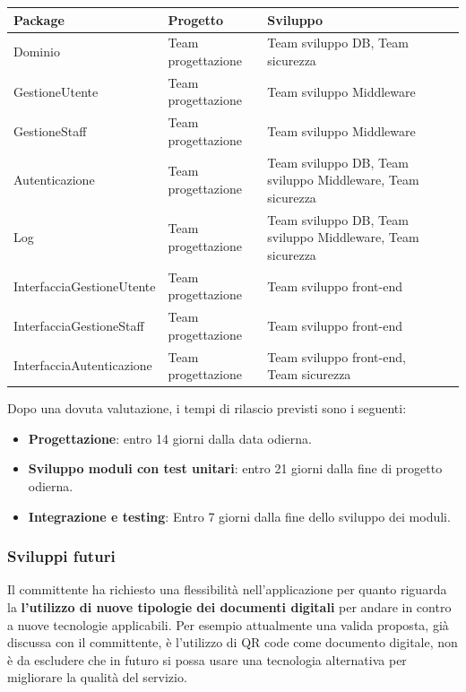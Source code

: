 \documentclass[a4paper]{article}
\begin{document}
\begin{center}
    \begin{tabularx}{1\textwidth}{|X|X|X|X|}
    \hline
    \textbf{Package} & \textbf{Progetto} & \textbf{Sviluppo}\\
    \hline
    \hline
    Dominio & Team progettazione & Team sviluppo DB, Team sicurezza  \\
    \hline
    GestioneUtente & Team progettazione & Team sviluppo Middleware\\
    \hline
    GestioneStaff & Team progettazione & Team sviluppo Middleware\\
    \hline
    Autenticazione & Team progettazione & Team sviluppo DB, Team sviluppo Middleware, Team sicurezza\\
    \hline
    Log & Team progettazione & Team sviluppo DB, Team sviluppo Middleware, Team sicurezza\\
    \hline
    InterfacciaGestioneUtente & Team progettazione & Team sviluppo front-end \\
    \hline
    InterfacciaGestioneStaff & Team progettazione & Team sviluppo front-end\\
    \hline
    InterfacciaAutenticazione & Team progettazione & Team sviluppo front-end, Team sicurezza\\
    \hline
    \end{tabularx}
\end{center}

Dopo una dovuta valutazione, i tempi di rilascio previsti sono i seguenti:

\begin{itemize}
    \item \textbf{Progettazione}: entro 14 giorni dalla data odierna.
    \item \textbf{Sviluppo moduli con test unitari}: entro 21 giorni dalla fine di progetto odierna.
    \item \textbf{Integrazione e testing}: Entro 7 giorni dalla fine dello sviluppo dei moduli.
\end{itemize}

\subsubsection{Sviluppi futuri}

Il committente ha richiesto una flessibilità nell'applicazione per quanto riguarda la \textbf{l'utilizzo di nuove tipologie dei documenti digitali} per andare in contro a nuove tecnologie applicabili. Per esempio attualmente una valida proposta, già discussa con il committente, è l'utilizzo di QR code come documento digitale, non è da escludere che in futuro si possa usare una tecnologia alternativa per migliorare la qualità del servizio.   
\end{document}
